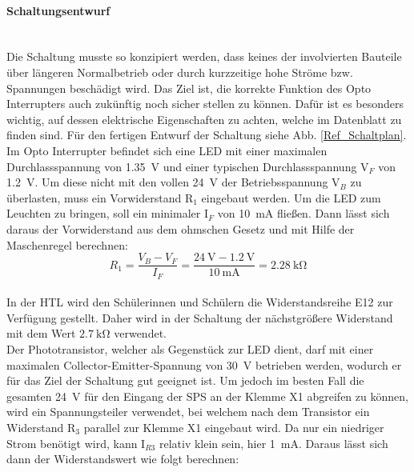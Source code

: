 \paragraph{Schaltungsentwurf} \mbox{}\\
Die Schaltung musste so konzipiert werden, dass keines der involvierten Bauteile über längeren Normalbetrieb oder durch kurzzeitige hohe Ströme bzw. Spannungen beschädigt wird. Das Ziel ist, die korrekte Funktion des Opto Interrupters auch zukünftig noch sicher stellen zu können. Dafür ist es besonders wichtig, auf dessen elektrische Eigenschaften zu achten, welche im Datenblatt zu finden sind. Für den fertigen Entwurf der Schaltung siehe Abb. \ref{Ref_Schaltplan}.\\
Im Opto Interrupter befindet sich eine LED mit einer maximalen Durchlassspannung von \qty{1.35}{\volt} und einer typischen Durchlassspannung V$_{F}$ von \qty{1.2}{\volt}. Um diese nicht mit den vollen \qty{24}{\volt} der Betriebsspannung V$_{B}$ zu überlasten, muss ein Vorwiderstand R$_{1}$ eingebaut werden. Um die LED zum Leuchten zu bringen, soll ein minimaler I$_{F}$ von \qty{10}{\milli\ampere} fließen. Dann lässt sich daraus der Vorwiderstand aus dem ohmschen Gesetz und mit Hilfe der Maschenregel berechnen:\\

\begin{equation*}
    R_{1} = \frac{V_{B} - V_{F}}{I_{F}} = \frac{\qty{24}{\volt} - \qty{1.2}{\volt}}{\qty{10}{\milli\ampere}} = \qty{2.28}{\kilo\ohm}
\end{equation*}\\

In der HTL wird den Schülerinnen und Schülern die Widerstandsreihe E12 zur Verfügung gestellt. Daher wird in der Schaltung der nächstgrößere Widerstand mit dem Wert $\qty{2,7}{\kilo\ohm}$ verwendet.\\
Der Phototransistor, welcher als Gegenstück zur LED dient, darf mit einer maximalen Collector-Emitter-Spannung von \qty{30}{\volt} betrieben werden, wodurch er für das Ziel der Schaltung gut geeignet ist. Um jedoch im besten Fall die gesamten \qty{24}{\volt} für den Eingang der SPS an der Klemme X1 abgreifen zu können, wird ein Spannungsteiler verwendet, bei welchem nach dem Transistor ein Widerstand R$_{3}$ parallel zur Klemme X1 eingebaut wird. Da nur ein niedriger Strom benötigt wird, kann I$_{R3}$ relativ klein sein, hier \qty{1}{\milli\ampere}. Daraus lässt sich dann der Widerstandswert wie folgt berechnen:\\

